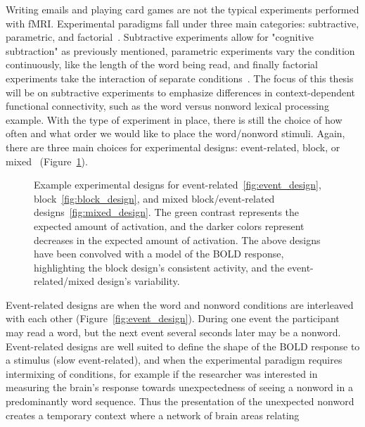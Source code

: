 \documentclass[phd,figures,tables,ackpage,abstractpage,publicabstractpage]{uithesis}
\begin{document}
Writing emails and playing card games are not the typical experiments performed with fMRI.
Experimental paradigms fall under three main categories: subtractive, parametric, and factorial~\cite{Friston1994}.
Subtractive experiments allow for "cognitive subtraction" as previously mentioned,
parametric experiments vary the condition continuously, like the length of the word being read, and finally
factorial experiments take the interaction of separate conditions~\cite{Friston1994}.
The focus of this thesis will be on subtractive experiments to emphasize differences
in context-dependent functional connectivity, such as the word versus nonword lexical processing example.
With the type of experiment in place, there is still the choice of how often and
what order we would like to place the word/nonword stimuli.
Again, there are three main choices for experimental designs:
event-related, block, or mixed~\cite{Friston1995b,Buckner1996,Petersen2012} (Figure~\ref{fig:example_designs}).
\begin{figure}[H]
  \centering
  \hfill
  \hfill
  \caption[Example Experimental Designs]{
    Example experimental designs for event-related~\ref{fig:event_design},
    block~\ref{fig:block_design},
    and mixed block/event-related designs~\ref{fig:mixed_design}.
    The green contrast represents the expected amount of activation, and the darker
    colors represent decreases in the expected amount of activation.
    The above designs have been convolved with a model of the BOLD
    response, highlighting the block design's consistent activity,
    and the event-related/mixed design's variability.
  }
  \label{fig:example_designs}
\end{figure}
Event-related designs are when the word and nonword conditions are interleaved with each other (Figure~\ref{fig:event_design}).
During one event the participant may read a word, but the next event several seconds later may be
a nonword.
Event-related designs are well suited to define the shape of the BOLD response to a stimulus (slow event-related),
and when the experimental paradigm requires intermixing of conditions, for example if the researcher
was interested in measuring the brain's response towards unexpectedness of seeing a nonword
in a predominantly word sequence.
Thus the presentation of the unexpected nonword creates a temporary context where a network of brain areas relating
\end{document}
